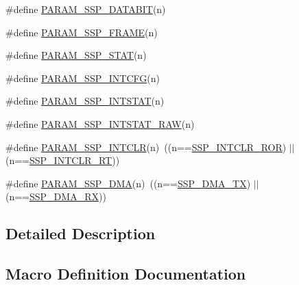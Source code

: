 \begin{DoxyCompactItemize}
\item 
\#define \hyperlink{group___s_s_p___private___macros_gac5e8b4305019ad0e61feb91045a98022}{P\+A\+R\+A\+M\+\_\+\+S\+S\+P\+\_\+\+D\+A\+T\+A\+B\+IT}(n)
\item 
\#define \hyperlink{group___s_s_p___private___macros_ga8699cff5eabd7c0ee2adeb9a664a87df}{P\+A\+R\+A\+M\+\_\+\+S\+S\+P\+\_\+\+F\+R\+A\+ME}(n)
\item 
\#define \hyperlink{group___s_s_p___private___macros_ga4fd35df4ab7870902e22527cd3154a65}{P\+A\+R\+A\+M\+\_\+\+S\+S\+P\+\_\+\+S\+T\+AT}(n)
\item 
\#define \hyperlink{group___s_s_p___private___macros_ga9bb68b8215a45161f425780001e07e7a}{P\+A\+R\+A\+M\+\_\+\+S\+S\+P\+\_\+\+I\+N\+T\+C\+FG}(n)
\item 
\#define \hyperlink{group___s_s_p___private___macros_gad0db59c15bcaf47f49b54f52098365c8}{P\+A\+R\+A\+M\+\_\+\+S\+S\+P\+\_\+\+I\+N\+T\+S\+T\+AT}(n)
\item 
\#define \hyperlink{group___s_s_p___private___macros_gaefeae7a57d23eb3f1fa9f36804fbcb06}{P\+A\+R\+A\+M\+\_\+\+S\+S\+P\+\_\+\+I\+N\+T\+S\+T\+A\+T\+\_\+\+R\+AW}(n)
\item 
\#define \hyperlink{group___s_s_p___private___macros_ga2f7034b2420cb7163a93f6a101a5e660}{P\+A\+R\+A\+M\+\_\+\+S\+S\+P\+\_\+\+I\+N\+T\+C\+LR}(n)~((n==\hyperlink{group___s_s_p___public___macros_gab79665cc09989a9730abb6b5452df1d7}{S\+S\+P\+\_\+\+I\+N\+T\+C\+L\+R\+\_\+\+R\+OR}) $\vert$$\vert$ (n==\hyperlink{group___s_s_p___public___macros_ga36b024118d27e68540e8e403b897ed75}{S\+S\+P\+\_\+\+I\+N\+T\+C\+L\+R\+\_\+\+RT}))
\item 
\#define \hyperlink{group___s_s_p___private___macros_ga871436ce24c4d561060ecc7a56a508a5}{P\+A\+R\+A\+M\+\_\+\+S\+S\+P\+\_\+\+D\+MA}(n)~((n==\hyperlink{group___s_s_p___public___macros_ga442c2b693b567292aaa17bdba6789094}{S\+S\+P\+\_\+\+D\+M\+A\+\_\+\+TX}) $\vert$$\vert$ (n==\hyperlink{group___s_s_p___public___macros_gac294ff35d73ad16084bd157fec3bcfc6}{S\+S\+P\+\_\+\+D\+M\+A\+\_\+\+RX}))
\end{DoxyCompactItemize}


\subsection{Detailed Description}


\subsection{Macro Definition Documentation}
